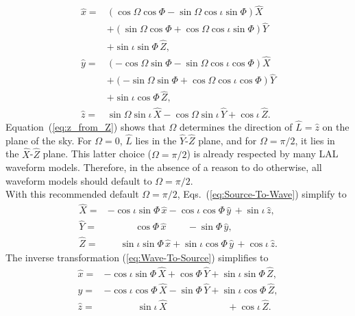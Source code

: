 \documentclass[11pt,tightenlines,article,amssymb,amsmath,amsfonts,superscriptaddress,nofootinbib]{revtex4}
\newcommand{\lNR}{\hat L}
\newcommand{\ExS}{{{\hat x}}}
\newcommand{\EyS}{{{\hat y}}}
\newcommand{\EzS}{{{\hat z}}}
\newcommand{\ExW}{\hat X}
\newcommand{\EyW}{\hat Y}
\newcommand{\EzW}{\hat Z}
\newcommand{\phiRef}{\Phi} %
\begin{document}
\begin{subequations}
  \label{eq:Wave-To-Source}
  \begin{align}
    \ExS=& \left(\cos\Omega\cos\phiRef-\sin\Omega\cos\iota\sin\phiRef\right)\ExW
    \nonumber \\
    & + \left(\sin\Omega\cos\phiRef+\cos\Omega\cos\iota\sin\phiRef\right)\EyW
    \nonumber\\
    & + \sin\iota\sin\phiRef\,\EzW,\\
\EyS=& \left(-\cos\Omega\sin\phiRef-\sin\Omega\cos\iota\cos\phiRef\right)\ExW
    \nonumber \\
    & + \left(-\sin\Omega\sin\phiRef+\cos\Omega\cos\iota\cos\phiRef\right)\EyW
    \nonumber\\
    & + \sin\iota\cos\phiRef\,\EzW,\\
\label{eq:z_from_Z}
    \EzS=&\sin\Omega\sin\iota\,\ExW-\cos\Omega\sin\iota\,\EyW + \cos\iota\,\EzW.
  \end{align}
  \end{subequations}
Equation~(\ref{eq:z_from_Z}) shows that $\Omega$ determines the
direction of $\lNR=\hat z$ on the plane of the sky.  For $\Omega=0$,
$\lNR$ lies in the $\EyW$-$\EzW$ plane, and for $\Omega=\pi/2$, it lies
in the $\ExW$-$\EzW$ plane. This latter choice ($\Omega=\pi/2$) is already 
respected by many LAL
waveform models.  Therefore, in the absence of a reason to do
otherwise, all waveform models should default to $\Omega=\pi/2$.  \\
With this recommended default $\Omega=\pi/2$,
Eqs.~(\ref{eq:Source-To-Wave}) simplify to
\begin{subequations}
  \label{eq:Source-To-Wave-Omega0}
  \begin{align}
    \ExW=& -\cos\iota\sin\phiRef\,\ExS-\cos\iota\cos\phiRef\,\EyS\,+\sin\iota\,\EzS,\\
    \EyW=&\quad\quad\;\;\; \cos\phiRef\,\ExS\qquad\,-\sin\phiRef\,\EyS,\\
\label{eq:Z_from_z-Omega0}
\EzW=&\;\;\;\;\,\sin\iota\sin\phiRef\,\ExS+\sin\iota\cos\phiRef\,\EyS\, + \cos\iota\,\EzS.
  \end{align}
  \end{subequations}
The inverse transformation (\ref{eq:Wave-To-Source}) simplifies to 
\begin{subequations}
  \label{eq:Wave-To-Source-Omega0}
  \begin{align}
    \ExS=& -\cos\iota\sin\phiRef\,\ExW+\cos\phiRef\,\EyW
    + \sin\iota\sin\phiRef\,\EzW,\\
    \EyS=& -\cos\iota\cos\phiRef\,\ExW-\sin\phiRef\,\EyW
    + \sin\iota\cos\phiRef\,\EzW,\\
    \EzS=&\qquad\quad\;\,\sin\iota\,\ExW \qquad\qquad\qquad\;+\cos\iota\,\EzW.
  \end{align}
  \end{subequations}
\end{document}
